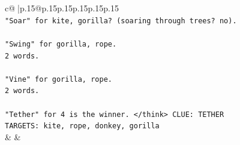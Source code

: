 \documentclass{article}
\begin{document}
{\begin{supertabular}{c@{$\;$}|p{.15\linewidth}@{}p{.15\linewidth}p{.15\linewidth}p{.15\linewidth}p{.15\linewidth}p{.15\linewidth}}
{{{\\ 
\texttt{"Soar" for kite, gorilla? (soaring through trees? no).} \\
\\ 
\texttt{"Swing" for gorilla, rope.} \\
\texttt{2 words.} \\
\\ 
\texttt{"Vine" for gorilla, rope.} \\
\texttt{2 words.} \\
\\ 
\texttt{"Tether" for 4 is the winner. </think> CLUE: TETHER} \\
\texttt{TARGETS: kite, rope, donkey, gorilla} \\
            }
        }
    }
    & & \\ \\


\end{supertabular}}
\end{document}
